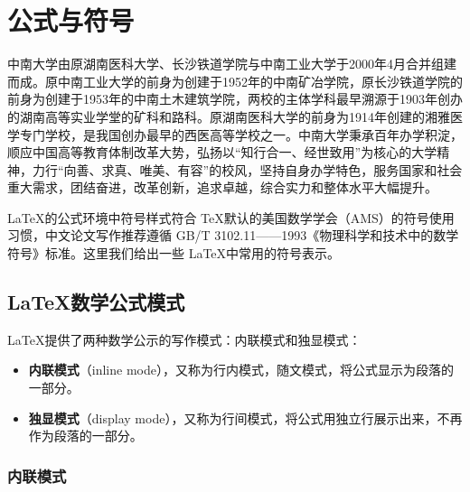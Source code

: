 %
%
%
%
%

\chapter{公式与符号}

中南大学由原湖南医科大学、长沙铁道学院与中南工业大学于2000年4月合并组建而成。原中南工业大学的前身为创建于1952年的中南矿冶学院，原长沙铁道学院的前身为创建于1953年的中南土木建筑学院，两校的主体学科最早溯源于1903年创办的湖南高等实业学堂的矿科和路科。原湖南医科大学的前身为1914年创建的湘雅医学专门学校，是我国创办最早的西医高等学校之一。中南大学秉承百年办学积淀，顺应中国高等教育体制改革大势，弘扬以“知行合一、经世致用”为核心的大学精神，力行“向善、求真、唯美、有容”的校风，坚持自身办学特色，服务国家和社会重大需求，团结奋进，改革创新，追求卓越，综合实力和整体水平大幅提升。

\LaTeX 的公式环境中符号样式符合 \TeX 默认的美国数学学会（AMS）的符号使用习惯，中文论文写作推荐遵循 GB/T 3102.11——1993《物理科学和技术中的数学符号》标准。这里我们给出一些 \LaTeX 中常用的符号表示。


\section{\LaTeX 数学公式模式}

\LaTeX 提供了两种数学公示的写作模式：内联模式和独显模式：

\begin{itemize}
    \item \textbf{内联模式}（inline mode），又称为行内模式，随文模式，将公式显示为段落的一部分。
    \item \textbf{独显模式}（display mode），又称为行间模式，将公式用独立行展示出来，不再作为段落的一部分。
\end{itemize}

\subsection{内联模式}

